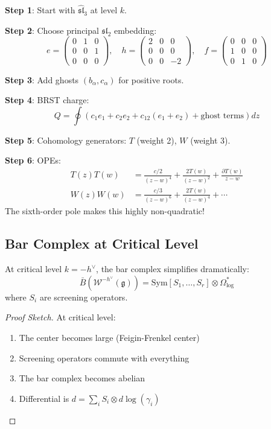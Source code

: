 \begin{example}
\textbf{Step 1}: Start with $\hat{\mathfrak{sl}}_3$ at level $k$.

\textbf{Step 2}: Choose principal $\mathfrak{sl}_2$ embedding:
\[
e = \begin{pmatrix} 0 & 1 & 0 \\ 0 & 0 & 1 \\ 0 & 0 & 0 \end{pmatrix}, \quad
h = \begin{pmatrix} 2 & 0 & 0 \\ 0 & 0 & 0 \\ 0 & 0 & -2 \end{pmatrix}, \quad
f = \begin{pmatrix} 0 & 0 & 0 \\ 1 & 0 & 0 \\ 0 & 1 & 0 \end{pmatrix}
\]

\textbf{Step 3}: Add ghosts $(b_\alpha, c_\alpha)$ for positive roots.

\textbf{Step 4}: BRST charge:
\[
Q = \oint \left( c_1 e_1 + c_2 e_2 + c_{12}(e_1 + e_2) + \text{ghost terms} \right) dz
\]

\textbf{Step 5}: Cohomology generators: $T$ (weight 2), $W$ (weight 3).

\textbf{Step 6}: OPEs:
\begin{align}
T(z)T(w) &= \frac{c/2}{(z-w)^4} + \frac{2T(w)}{(z-w)^2} + \frac{\partial T(w)}{z-w} \\
W(z)W(w) &= \frac{c/3}{(z-w)^6} + \frac{2T(w)}{(z-w)^4} + \cdots
\end{align}
The sixth-order pole makes this highly non-quadratic!
\end{example}

\subsection{Bar Complex at Critical Level}

\begin{theorem}
At critical level $k = -h^{\vee}$, the bar complex simplifies dramatically:
\[
\bar{B}(\mathcal{W}^{-h^{\vee}}(\mathfrak{g})) = \text{Sym}[S_1, \ldots, S_r] \otimes \Omega^*_{\log}
\]
where $S_i$ are screening operators.
\end{theorem}

\begin{proof}[Proof Sketch]
At critical level:
\begin{enumerate}
\item The center becomes large (Feigin-Frenkel center)
\item Screening operators commute with everything
\item The bar complex becomes abelian
\item Differential is $d = \sum_i S_i \otimes d\log(\gamma_i)$
\end{enumerate}
\end{proof}

